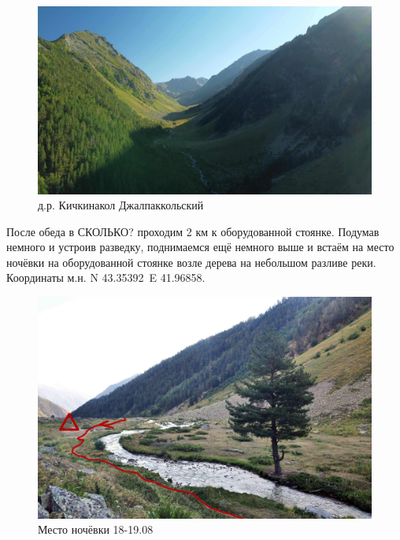 \begin{figure}[h]
	\centering
	\includegraphics[width=0.7\linewidth]{../pics/DJI_0805}
	\caption{д.р. Кичкинакол Джалпаккольский}
	\label{fig:kichkinakol}
\end{figure}

После обеда в \alert{СКОЛЬКО?} проходим 2 км к оборудованной стоянке. Подумав немного и устроив разведку, поднимаемся ещё немного выше и встаём на место ночёвки на оборудованной стоянке возле дерева на небольшом разливе реки. Координаты м.н. N 43.35392\degree~E 41.96858\degree.
\begin{figure}[h]
	\centering
	\includegraphics[width=0.7\linewidth]{../pics/camp_18}
	\caption{Место ночёвки 18-19.08}
	\label{fig:camp_18}
\end{figure}


\newpage